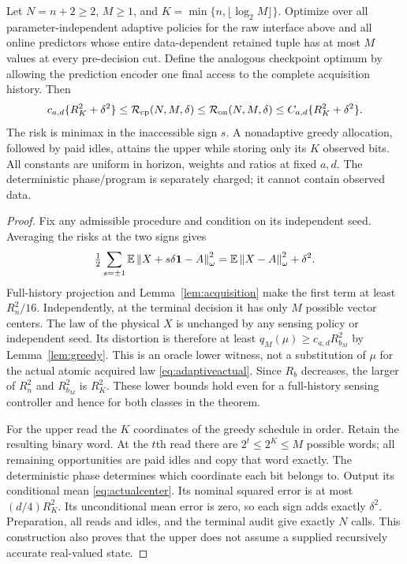 \begin{theorem}\label{thm:adaptive}
Let $N=n+2\ge2$, $M\ge1$, and $K=\min\{n,\lfloor\log_2M\rfloor\}$. Optimize over all parameter-independent adaptive policies for the raw interface above and all online predictors whose entire data-dependent retained tuple has at most $M$ values at every pre-decision cut. Define the analogous checkpoint optimum by allowing the prediction encoder one final access to the complete acquisition history. Then
\begin{equation}\label{eq:adaptivelaw}
 c_{a,d}\{R_K^2+\delta^2\}
 \le\mathcal R_{\mathrm{cp}}(N,M,\delta)
 \le\mathcal R_{\mathrm{on}}(N,M,\delta)
 \le C_{a,d}\{R_K^2+\delta^2\}.
\end{equation}
The risk is minimax in the inaccessible sign $s$. A nonadaptive greedy allocation, followed by paid idles, attains the upper while storing only its $K$ observed bits. All constants are uniform in horizon, weights and ratios at fixed $a,d$. The deterministic phase/program is separately charged; it cannot contain observed data.
\end{theorem}
\begin{proof}
Fix any admissible procedure and condition on its independent seed. Averaging the risks at the two signs gives
\[
 \tfrac12\sum_{s=\pm1}\mathbb E\left\lVert X+s\delta\mathbf1-A\right\rVert_\omega^2
 =\mathbb E\left\lVert X-A\right\rVert_\omega^2+\delta^2.
\]
Full-history projection and Lemma~\ref{lem:acquisition} make the first term at least $R_n^2/16$. Independently, at the terminal decision it has only $M$ possible vector centers. The law of the physical $X$ is unchanged by any sensing policy or independent seed. Its distortion is therefore at least $q_M(\mu)\ge c_{a,d}R_{b_M}^2$ by Lemma~\ref{lem:greedy}. This is an oracle lower witness, not a substitution of $\mu$ for the actual atomic acquired law \eqref{eq:adaptiveactual}. Since $R_b$ decreases, the larger of $R_n^2$ and $R_{b_M}^2$ is $R_K^2$. These lower bounds hold even for a full-history sensing controller and hence for both classes in the theorem.

For the upper read the $K$ coordinates of the greedy schedule in order. Retain the resulting binary word. At the $t$th read there are $2^t\le2^K\le M$ possible words; all remaining opportunities are paid idles and copy that word exactly. The deterministic phase determines which coordinate each bit belongs to. Output its conditional mean \eqref{eq:actualcenter}. Its nominal squared error is at most $(d/4)R_K^2$. Its unconditional mean error is zero, so each sign adds exactly $\delta^2$. Preparation, all reads and idles, and the terminal audit give exactly $N$ calls. This construction also proves that the upper does not assume a supplied recursively accurate real-valued state.
\end{proof}

